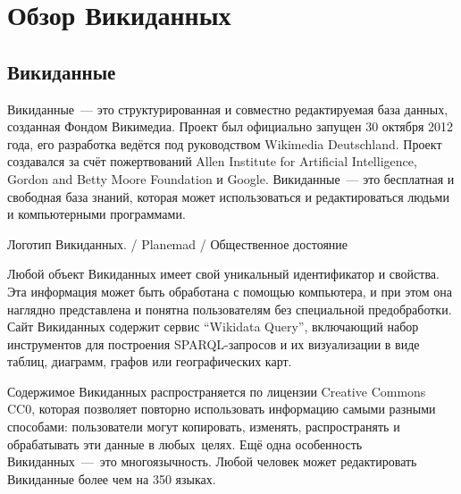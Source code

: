 \chapter{Обзор Викиданных}
\label{ch:ReviewAboutWD}

\section{Викиданные}

Викиданные~--- это структурированная и совместно редактируемая база данных, созданная Фондом Викимедиа\footnotemark.  Проект был официально запущен 30 октября 2012 года, его разработка ведётся под руководством Wikimedia Deutschland\footnotemark.  Проект создавался за счёт пожертвований Allen Institute for Artificial Intelligence, Gordon and Betty Moore Foundation и Google. Викиданные~--- это бесплатная и свободная база знаний, которая может использоваться и редактироваться людьми и компьютерными программами\cite{Vrandecic}.\begin{marginfigure}[0.0cm]
{
	\setlength{\fboxsep}{0pt}%
	\setlength{\fboxrule}{1pt}%
}
\caption
{Логотип Викиданных.  / Planemad / Общественное достояние
}
\label{fig:seyu}
\end{marginfigure}

Любой объект Викиданных имеет свой уникальный идентификатор и свойства. Эта информация может быть обработана с помощью компьютера, и при этом она наглядно представлена и понятна пользователям без специальной предобработки. Сайт Викиданных содержит сервис ``Wikidata Query''\footnotemark {}, включающий набор инструментов для построения SPARQL-запросов и их визуализации в виде таблиц, диаграмм, графов или географических карт.

Содержимое Викиданных распространяется по лицензии Creative Commons CC0, которая позволяет повторно использовать информацию самыми разными способами: пользователи могут копировать, изменять, распространять и обрабатывать эти данные в любых целях. Ещё одна особенность Викиданных~--- это многоязычность. Любой человек может редактировать Викиданные более чем на 350 языках.

